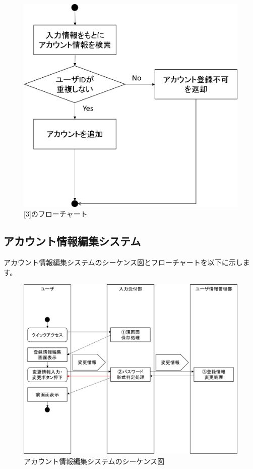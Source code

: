 \begin{figure}[htbp]
  \begin{center}
    \includegraphics[width=0.5\linewidth,clip]{./img/admin_create_account/sub3.png}
    \caption{[3]のフローチャート}\label{fig:admincreateaccountflow1}
  \end{center}
\end{figure}


\newpage
\subsection{アカウント情報編集システム}
アカウント情報編集システムのシーケンス図とフローチャートを以下に示します。

\begin{figure}[htbp]
  \begin{center}
    \includegraphics[width=1\linewidth,clip]{./img/edit_account/main.png}
    \caption{アカウント情報編集システムのシーケンス図}\label{fig:editaccountseaquence}
  \end{center}
\end{figure}


